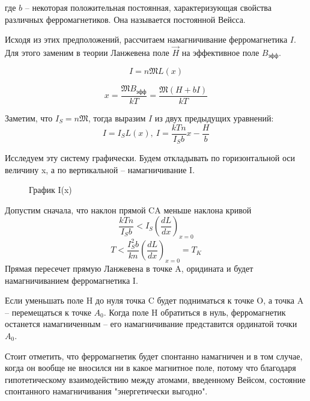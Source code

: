 \documentclass[a4paper,14pt]{article} %
\begin{document}
где $b$ -- некоторая положительная постоянная, характеризующая свойства различных ферромагнетиков. Она называется постоянной Вейсса.

Исходя из этих предположений, рассчитаем намагничивание ферромагнетика $I$. Для этого заменим в теории Ланжевена поле $\overrightarrow{H}$ на эффективное поле $B_\text{эфф}$.

\[I = n\mathfrak{M}L(x)\]

\[x = \frac{\mathfrak{M}B_\text{эфф}}{kT} = \frac{\mathfrak{M}(H + bI)}{kT}\]

Заметим, что $I_S = n\mathfrak{M}$, тогда выразим $I$ из двух предыдущих уравнений:
\[I = I_S L(x), ~I = \frac{kTn}{I_S b}x - \frac{H}{b}\]

Исследуем эту систему графически. Будем откладывать по горизонтальной оси величину x, а по вертикальной -- намагничивание I.

\begin{figure}[H]
	\caption{График I(x)}
\end{figure}

Допустим сначала, что наклон прямой CA меньше наклона кривой
\[\frac{kTn}{I_Sb} < I_S\left(\frac{dL}{dx}\right)_{x=0}\]
\[T < \frac{I_S^2 b}{kn}\left(\frac{dL}{dx}\right)_{x=0} = T_K\]
Прямая пересечет прямую Ланжевена в точке A, оридината и будет намагничиванием ферромагнетика I.

Если уменьшать поле H до нуля точка C будет подниматься к точке O, а точка A -- перемещаться к точке $A_0$. Когда поле H обратиться в нуль, ферромагнетик останется намагниченным -- его намагничивание представится ординатой точки $A_0$. 

Стоит отметить, что ферромагнетик будет спонтанно намагничен и в том случае, когда он вообще не вносился ни в какое магнитное поле, потому что благодаря гипотетическому взаимодействию между атомами, введенному Вейсом, состояние спонтанного намагничивания "энергетически выгодно".
\end{document}
